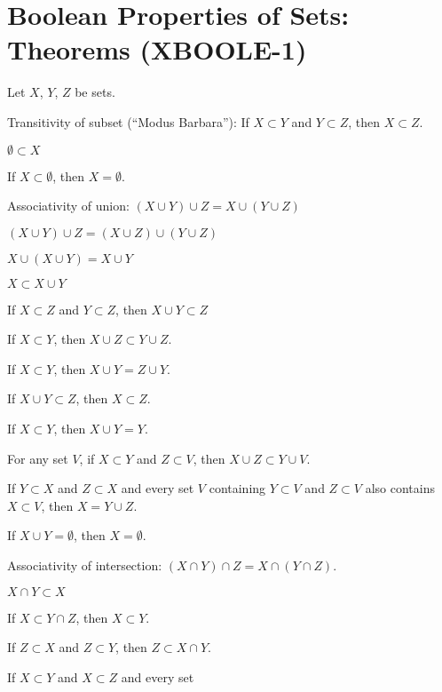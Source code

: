 \section{Boolean Properties of Sets: Theorems (XBOOLE-1)}

Let $X$, $Y$, $Z$ be sets.
\begin{thm}
\item\label{xboole1:1} Transitivity of subset (``Modus Barbara''): If $X\subset Y$ and $Y\subset Z$, then $X\subset Z$.
\item\label{xboole1:2} $\emptyset\subset X$
\item\label{xboole1:3} If $X\subset\emptyset$, then $X=\emptyset$.
\item\label{xboole1:4} Associativity of union: $(X\cup Y)\cup Z=X\cup(Y\cup Z)$
\item\label{xboole1:5} $(X\cup Y)\cup Z=(X\cup Z)\cup(Y\cup Z)$
\item\label{xboole1:6} $X\cup(X\cup Y)=X\cup Y$
\item\label{xboole1:7} $X\subset X\cup Y$
\item\label{xboole1:8} If $X\subset Z$ and $Y\subset Z$, then $X\cup Y\subset Z$
\item\label{xboole1:9} If $X\subset Y$, then $X\cup Z\subset Y\cup Z$.
\item\label{xboole1:10} If $X\subset Y$, then $X\cup Y=Z\cup Y$.
\item\label{xboole1:11} If $X\cup Y\subset Z$, then $X\subset Z$.
\item\label{xboole1:12} If $X\subset Y$, then $X\cup Y=Y$.
\item\label{xboole1:13} For any set $V$, if $X\subset Y$ and $Z\subset V$,
  then $X\cup Z\subset Y\cup V$.
\item\label{xboole1:14} If $Y\subset X$ and $Z\subset X$ and every set $V$ containing
  $Y\subset V$ and $Z\subset V$ also contains $X\subset V$,
  then $X=Y\cup Z$.
\item\label{xboole1:15} If $X\cup Y=\emptyset$, then $X=\emptyset$.
\item\label{xboole1:16} Associativity of intersection: $(X\cap Y)\cap Z=X\cap(Y\cap Z)$.
\item\label{xboole1:17} $X\cap Y\subset X$
\item\label{xboole1:18} If $X\subset Y\cap Z$, then $X\subset Y$.
\item\label{xboole1:19} If $Z\subset X$ and $Z\subset Y$, then $Z\subset X\cap Y$.
\item\label{xboole1:20} If $X\subset Y$ and $X\subset Z$ and every set

\end{thm}

